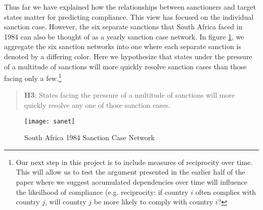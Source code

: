 Thus far we have explained how the relationships between sanctioners and target states matter for predicting compliance. This view has focused on the individual sanction case. However, the six separate sanctions that South Africa faced in 1984 can also be thought of as a yearly sanction case network. In figure \ref{fig:sanet}, we aggregate the six sanction networks into one where each separate sanction is denoted by a differing color. Here we hypothesize that states under the pressure of a multitude of sanctions will more quickly resolve sanction cases than those facing only a few.\footnote{Our next step in this project is to include measures of reciprocity over time. This will allow us to test the argument presented in the earlier half of the paper where we suggest accumulated dependencies over time will influence the likeilhood of compliance (e.g. reciprocity: if country $i$ often complies with country $j$, will country $j$ be more likely to comply with country $i$?}


\begin{quote}
	\textbf{H3}: States facing the pressure of a multitude of sanctions will more quickly resolve any one of those sanction cases.
\end{quote}

\begin{figure}[ht]
	\centering
	\texttt{[image: sanet]}
	\caption{South Africa 1984 Sanction Case Network}
	\label{fig:sanet}
\end{figure}
\FloatBarrier





